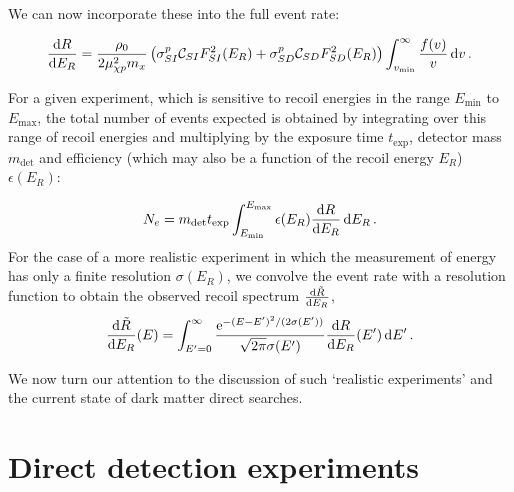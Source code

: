 We can now incorporate these into the full event rate:

\begin{equation}
\frac{\mathrm{d}R}{\mathrm{d}E_R} = \frac{\rho_0}{2 \mu_{\chi p}^2 m_x}\left( \sigma_{SI}^p \mathcal{C}_{SI} F_{SI}^2(E_R) + \sigma_{SD}^p \mathcal{C}_{SD} F_{SD}^2(E_R) \right) \int_{v_\textrm{min}}^\infty \frac{f(v)}{v}\,\mathrm{d}v\,.
\end{equation}

For a given experiment, which is sensitive to recoil energies in the range $E_\textrm{min}$ to $E_\textrm{max}$, the total number of events expected is obtained by integrating over this range of recoil energies and multiplying by the exposure time $t_\textrm{exp}$, detector mass $m_\textrm{det}$ and efficiency (which may also be a function of the recoil energy $E_R$) $\epsilon(E_R)$:

\begin{equation}
N_e = m_\textrm{det} t_\textrm{exp} \int_{E_\textrm{min}}^{E_\textrm{max}}\epsilon(E_R) \frac{\mathrm{d}R}{\mathrm{d}E_R} \, \mathrm{d}E_R\,.
\end{equation}
For the case of a more realistic experiment in which the measurement of energy has only a finite resolution $\sigma(E_R)$, we convolve the event rate with a resolution function to obtain the observed recoil spectrum $\frac{\mathrm{d}\tilde{R}}{\mathrm{d}E_R}$,
\begin{equation}
\frac{\mathrm{d}\tilde{R}}{\mathrm{d}E_R}(E) = \int_{E' = 0}^{\infty} \frac{\mathrm{e}^{-(E - E')^2/(2\sigma(E'))}}{\sqrt{2\pi}\sigma(E')} \frac{\mathrm{d}R}{\mathrm{d}E_R}(E') \, \mathrm{d}E'\,.
\end{equation} 

We now turn our attention to the discussion of such `realistic experiments' and the current state of dark matter direct searches. 


\section{Direct detection experiments}


